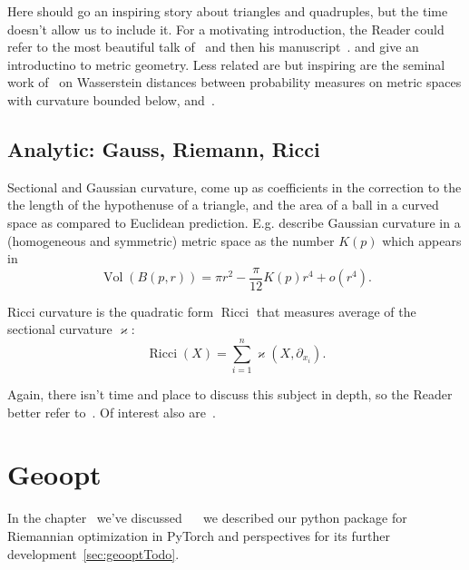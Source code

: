 Here should go an inspiring story about triangles and quadruples, but the time
doesn't allow us to include it.
For a motivating introduction, the Reader could refer to the most beautiful
talk of~\citet{villaniTriangles} and then his manuscript~\cite{villaniOldNew}.
\citet{burago} and \citet{alexander} give an introductino to metric geometry.
Less related are but inspiring are the seminal work of~\citet{sturm} on Wasserstein
distances between probability measures on metric spaces with curvature bounded
below, and~\citet{le2017existence}.

\subsection*{Analytic: Gauss, Riemann, Ricci}

Sectional and Gaussian curvature, come up as coefficients in the correction to
the the length of the hypothenuse of a triangle, and the area of a ball in a
curved space as compared to Euclidean prediction.
E.g. \citet{burago} describe Gaussian curvature in a (homogeneous and
symmetric) metric space as the number \( K(p) \) which appears in
\[ \operatorname{Vol}(B(p, r)) = \pi r^2 - \frac{\pi}{12}K(p) r^4 + o(r^4). \]

Ricci curvature is the quadratic form \( \operatorname{Ricci} \) that measures
average of the sectional curvature \( \varkappa \):
\[ \operatorname{Ricci}(X) = \sum_{i=1}^n \varkappa(X, \partial_{x_i}). \]

Again, there isn't time and place to discuss this subject in depth, so the
Reader better refer to~\citet{leeRiem}.  Of interest also
are~\citet{feyCurv,gravityLight,burago}.

\section{Geoopt}

In the chapter~ we've discussed
~~\cite{geoopt} we described our python package for
Riemannian optimization in PyTorch and perspectives for its further
development~\autoref{sec:geooptTodo}.
